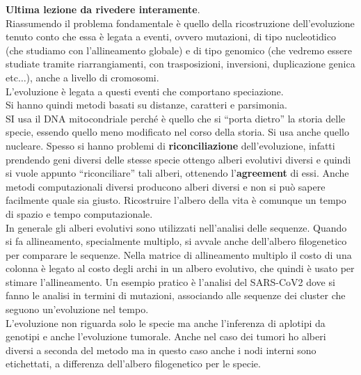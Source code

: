 \documentclass[a4paper,12pt, oneside]{book}
\begin{document}
\textbf{Ultima lezione da rivedere interamente}.\\
Riassumendo il problema fondamentale è quello della ricostruzione
dell'evoluzione tenuto conto che essa è legata a eventi, ovvero mutazioni, di
tipo nucleotidico (che studiamo con l'allineamento globale) e di tipo genomico
(che vedremo essere studiate tramite riarrangiamenti, con trasposizioni,
inversioni, duplicazione genica etc$\ldots$), anche a livello di cromosomi.\\
L'evoluzione è legata a questi eventi che comportano speciazione.\\
Si hanno quindi metodi basati su distanze, caratteri e parsimonia.\\
SI usa il DNA mitocondriale perché è quello che si ``porta dietro'' la storia
delle specie, essendo quello meno modificato nel corso della storia. Si usa
anche quello nucleare. Spesso si hanno problemi di \textbf{riconciliazione}
dell'evoluzione, infatti prendendo geni diversi delle stesse specie ottengo
alberi evolutivi diversi e quindi si vuole appunto ``riconciliare'' tali alberi,
ottenendo l'\textbf{agreement} di essi. Anche metodi computazionali diversi
producono alberi diversi e non si può sapere facilmente quale sia
giusto. Ricostruire l'albero della vita è comunque un tempo di spazio e tempo
computazionale. \\
In generale gli alberi evolutivi sono utilizzati nell'analisi delle
sequenze. Quando si fa allineamento, specialmente multiplo, si avvale anche
dell'albero filogenetico per comparare le sequenze. Nella matrice di
allineamento multiplo il costo di una colonna è legato al costo degli archi in
un albero evolutivo, che quindi è usato per stimare l'allineamento. Un esempio
pratico è l'analisi del SARS-CoV2 dove si fanno le analisi in termini di
mutazioni, associando alle sequenze dei cluster che seguono un'evoluzione nel
tempo. \\
L'evoluzione non riguarda solo le specie ma anche l'inferenza di aplotipi da
genotipi e anche l'evoluzione tumorale. Anche nel caso dei tumori ho alberi
diversi a seconda del metodo ma in questo caso anche i nodi interni sono
etichettati, a differenza dell'albero filogenetico per le specie.
\end{document}
